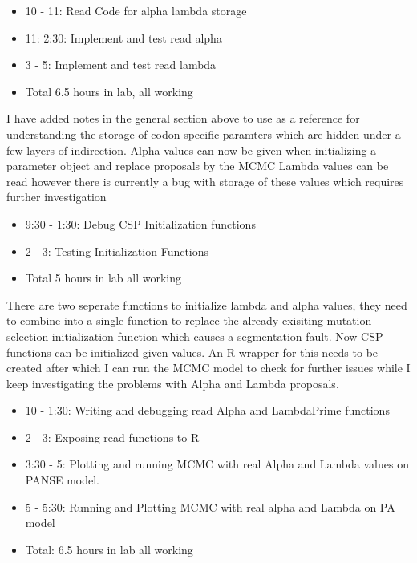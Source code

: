 \documentclass[12pt,hyperref]{labbook}
\begin{document}
\begin{itemize}
    \item 10 - 11: Read Code for alpha lambda storage
    \item 11: 2:30: Implement and test read alpha
    \item 3 - 5: Implement and test read lambda
    \item Total 6.5 hours in lab, all working
\end{itemize}
I have added notes in the general section above to use as a reference for understanding the storage of codon specific paramters which are hidden under a few layers of indirection.
Alpha values can now be given when initializing a parameter object and replace proposals by the MCMC
Lambda values can be read however there is currently a bug with storage of these values which requires further investigation
\begin{itemize}
    \item 9:30 - 1:30: Debug CSP Initialization functions
    \item 2 - 3: Testing Initialization Functions
    \item Total 5 hours in lab all working
\end{itemize}
There are two seperate functions to initialize lambda and alpha values, they need to combine into a single function to replace the already exisiting mutation selection initialization function which causes a segmentation fault. Now CSP functions can be initialized given values. An R wrapper for this needs to be created after which I can run the MCMC model to check for further issues while I keep investigating the problems with Alpha and Lambda  proposals.
\begin{itemize}
    \item 10 - 1:30: Writing and debugging read Alpha and LambdaPrime functions
    \item 2 - 3: Exposing read functions to R
    \item 3:30 - 5: Plotting and running MCMC with real Alpha and Lambda values on PANSE model.
    \item 5 - 5:30: Running and Plotting MCMC with real alpha and Lambda on PA model
    \item Total: 6.5 hours in lab all working
\end{itemize}
\end{document}
